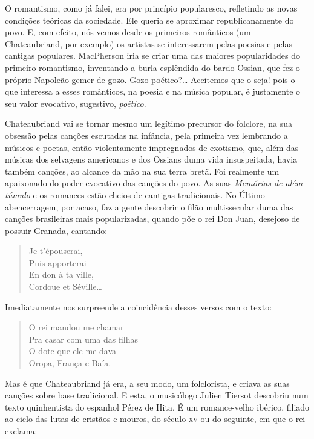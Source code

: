 O romantismo, como já falei, era por princípio popularesco, refletindo
as novas condições teóricas da sociedade. Ele queria se aproximar
republicanamente do povo. E, com efeito, nós vemos desde os primeiros
românticos (um Chateaubriand, por exemplo) os artistas se interessarem
pelas poesias e pelas cantigas populares. MacPherson iria se criar uma
das maiores popularidades do primeiro romantismo, inventando a burla
esplêndida do bardo Ossian, que fez o próprio Napoleão gemer de gozo.
Gozo poético?\ldots{} Aceitemos que o seja! pois o que interessa a esses
românticos, na poesia e na música popular, é justamente o seu valor
evocativo, sugestivo, \textit{poético}.

Chateaubriand vai se tornar mesmo um legítimo precursor do folclore, na
sua obsessão pelas canções escutadas na infância, pela primeira vez
lembrando a músicos e poetas, então violentamente impregnados de
exotismo, que, além das músicas dos selvagens americanos e dos Ossians
duma vida insuspeitada, havia também canções, ao alcance da mão na sua
terra bretã. Foi realmente um apaixonado do poder evocativo das canções
do povo. As suas \textit{Memórias de além-túmulo} e os romances estão cheios de
cantigas tradicionais. No Último abencerragem, por acaso, faz a gente
descobrir o filão multissecular duma das canções brasileiras mais
popularizadas, quando põe o rei Don Juan, desejoso de possuir Granada,
cantando:

\begin{verse}
Je t'épouserai,\\
Puis apporterai\\
En don à ta ville,\\
Cordoue et Séville\ldots{}
\end{verse}

Imediatamente nos surpreende a coincidência desses versos com o texto:

\begin{verse}
O rei mandou me chamar\\
Pra casar com uma das filhas\\
O dote que ele me dava\\
Oropa, França e Baía.
\end{verse}

Mas é que Chateaubriand já era, a seu modo, um folclorista, e criava as
suas canções sobre base tradicional. E esta, o musicólogo Julien Tiersot
descobriu num texto quinhentista do espanhol Pérez de Hita. É um
romance-velho ibérico, filiado ao ciclo das lutas de cristãos e mouros,
do século \textsc{xv} ou do seguinte, em que o rei exclama:

